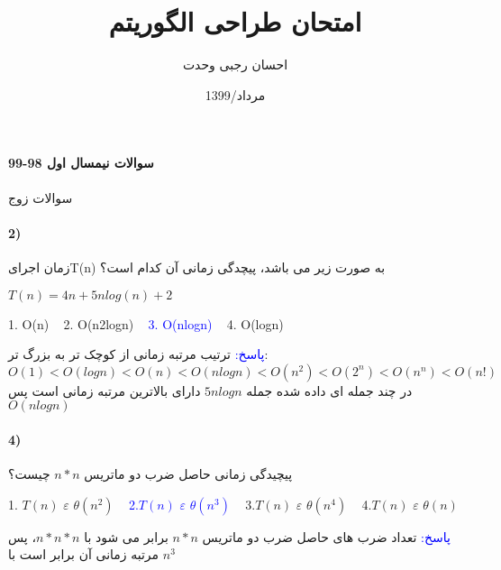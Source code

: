 \documentclass[10pt,a4paper]{article}
\begin{document}
	\title{امتحان طراحی الگوریتم}
	\date{1399/مرداد}
	\author{احسان رجبی وحدت}
	\maketitle
	\newpage
	\paragraph{سوالات نیمسال اول 98-99}
سوالات زوج

	\paragraph{2)} زمان اجرایT(n) به صورت زیر می باشد، پیچدگی زمانی آن کدام است؟
	\begin{flushleft}                           
		$T(n) = 4n + 5nlog(n) + 2$
	\end{flushleft}
	\begin{flushright} 
		1. O(n)\,\,\,\,\, 2. O(n2logn)\,\,\,\,\, \textcolor{blue}{3. O(nlogn)}\,\,\,\,\, 4. O(logn)
	\end{flushright}
	\begin{flushright} 
		\textcolor{blue}{پاسخ:}
	ترتیب مرتبه زمانی از کوچک تر به بزرگ تر:
		$O(1)<O(logn)<O(n)<O(nlogn)<O(n^2)<O(2^n)<O(n^n)<O(n!)$
	\\ در چند جمله ای داده شده جمله $5nlogn$ دارای بالاترین مرتبه زمانی است پس $O(nlogn)$
	\end{flushright}

	\paragraph{4)} پیچیدگی زمانی حاصل ضرب دو ماتریس $n*n$ چیست؟
	\begin{flushright} 
		1. $T(n)\,\,\varepsilon\,\,\theta(n^2)$\,\,\,\,\, \textcolor{blue}{2.$T(n)\,\,\varepsilon\,\,\theta(n^3)$}\,\,\,\,\, 3.$T(n)\,\,\varepsilon\,\,\theta(n^4)$\,\,\,\,\, 4.$T(n)\,\,\varepsilon\,\,\theta(n)$
	\end{flushright}
	\begin{flushright} 
		\textcolor{blue}{پاسخ:}
	تعداد ضرب های حاصل ضرب دو ماتریس $n*n$ برابر می شود با $n*n*n$، پس مرتبه زمانی آن برابر است با $n^3$
	\end{flushright}
\end{document}
